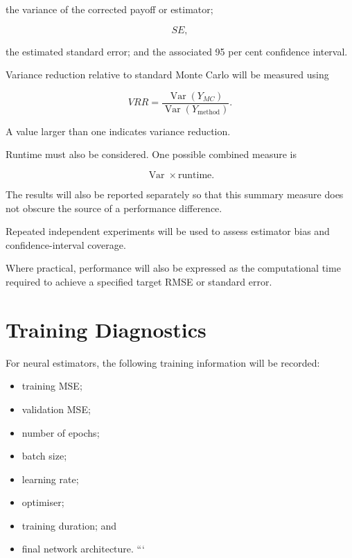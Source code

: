 \documentclass[12pt,a4paper]{report}
\begin{document}
the variance of the corrected payoff or estimator;

\begin{equation}
SE,
\end{equation}

the estimated standard error; and the associated 95 per cent confidence interval.

Variance reduction relative to standard Monte Carlo will be measured using

\begin{equation}
VRR
=
\frac{
\operatorname{Var}(Y_{MC})
}{
\operatorname{Var}(Y_{\mathrm{method}})
}.
\end{equation}

A value larger than one indicates variance reduction.

Runtime must also be considered. One possible combined measure is

\begin{equation}
\operatorname{Var}
\times
\text{runtime}.
\end{equation}

The results will also be reported separately so that this summary measure does not obscure the source of a performance difference.

Repeated independent experiments will be used to assess estimator bias and confidence-interval coverage.

Where practical, performance will also be expressed as the computational time required to achieve a specified target RMSE or standard error.

\section{Training Diagnostics}

For neural estimators, the following training information will be recorded:

\begin{itemize}

```
\item training MSE;

\item validation MSE;

\item number of epochs;

\item batch size;

\item learning rate;

\item optimiser;

\item training duration; and

\item final network architecture.
```

\end{itemize}
\end{document}
